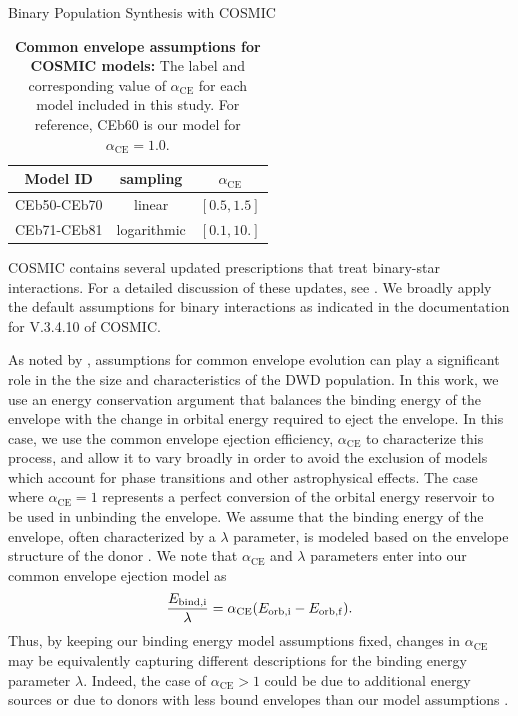\documentclass[twocolumn]{aastex631}
\newcommand*{\alphaCE}{\alpha_{\mathrm{CE}}}
\begin{document}
\begin{subsection}{Binary Population Synthesis with COSMIC}
\begin{table}[!ht]
\centering
\begin{tabular}{|c|c|c|}
\hline
Model ID & sampling & $\alphaCE$ \\
\hline
CEb50-CEb70 & linear & $[0.5, 1.5]$ \\
\hline
CEb71-CEb81 & logarithmic & $[0.1, 10.]$ \\
\hline
\end{tabular}
\caption{\label{tab:CEmodels}
\textbf{Common envelope assumptions for COSMIC models:}
The label and corresponding value of $\alphaCE$ for each model included in this study.
For reference, CEb60 is our model for $\alphaCE = 1.0$.
}
\end{table}

COSMIC contains several updated prescriptions that treat binary-star
    interactions. For a detailed discussion of these updates, see
    \citet{Breivik2020}.
We broadly apply the default assumptions for binary interactions 
    as indicated in the documentation for V.3.4.10 of COSMIC.

As noted by \citet{Thiele2023}, assumptions for common envelope
    evolution can play a significant role in the the size and characteristics of
    the DWD population.
In this work, we use an energy conservation argument 
    \citep[e.g.][]{Paczynski1976} that balances the binding energy of the envelope
    with the change in orbital energy required to eject the envelope.
In this case, we use the common envelope ejection efficiency, $\alphaCE$
    to characterize this process,
    and allow it to vary broadly in order to avoid the exclusion of models 
    which account for phase transitions and other astrophysical effects.
The case where $\alphaCE=1$ represents a perfect conversion of the orbital 
    energy reservoir to be used in unbinding the envelope.
We assume that the binding energy of the envelope, often characterized 
    by a $\lambda$ parameter, is modeled based on the envelope structure of 
    the donor \citep[as described in Appendix A of][]{Claeys2014}.
We note that $\alphaCE$ and $\lambda$ parameters enter into our common envelope 
    ejection model as
\begin{equation}
    \frac{E_{\rm{bind,i}}}{\lambda} = \alphaCE (E_{\rm{orb,i}} - E_{\rm{orb,f}}).
\end{equation}
Thus, by keeping our binding energy model assumptions fixed, changes 
    in $\alphaCE$ may be equivalently capturing different descriptions for the binding 
    energy parameter $\lambda$.
Indeed, the case of $\alphaCE>1$ could be due to additional energy sources 
    or due to donors with less 
    bound envelopes than our model assumptions \citep{Yamaguchi2024a,Yamaguchi2024b}.


\end{subsection}
\end{document}
